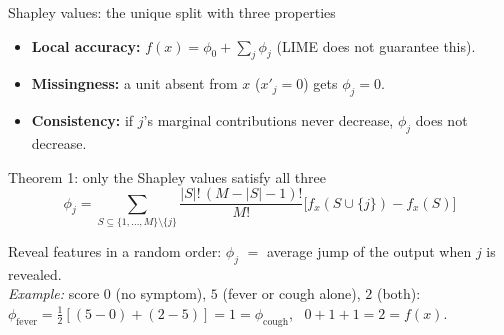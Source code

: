 \documentclass[aspectratio=169,11pt]{beamer}
\begin{document}
\begin{frame}{Shapley values: the unique split with three properties}
  \vspace{0.2em}
  {\small
  \begin{itemize}
    \item \textbf{Local accuracy:} $f(x)=\phi_0+\sum_j\phi_j$
      \quad (LIME does not guarantee this).
    \pause
    \item \textbf{Missingness:} a unit absent from $x$ ($x'_j=0$)
      gets $\phi_j=0$.
    \pause
    \item \textbf{Consistency:} if $j$'s marginal contributions never
      decrease, $\phi_j$ does not decrease.
  \end{itemize}
  }

  \pause
  \begin{block}{Theorem 1: only the Shapley values satisfy all three}
    \[
      \phi_j=\sum_{S\subseteq\{1,\dots,M\}\setminus\{j\}}
      \frac{|S|!\,(M-|S|-1)!}{M!}
      \bigl[f_x(S\cup\{j\})-f_x(S)\bigr]
    \]
  \end{block}

  \pause
  {\small
  Reveal features in a random order: $\phi_j$ $=$ average jump of the
  output when $j$ is revealed.\\[0.2em]
  \emph{Example:} score $0$ (no symptom), $5$ (fever or cough alone),
  $2$ (both):
  $\phi_{\text{fever}}=\tfrac12[(5-0)+(2-5)]=1=\phi_{\text{cough}}$,
  \ $0+1+1=2=f(x)$.
  }
\end{frame}
\end{document}
